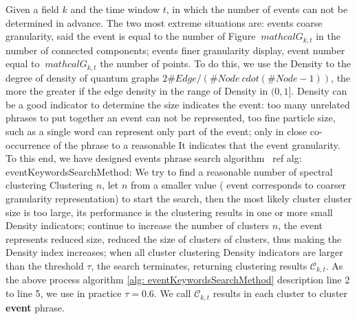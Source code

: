 \documentclass[conference,compsoc]{IEEEtran}
\begin{document}
Given a field \(k \) and the time window \(t \), in which the number of events can not be determined in advance.
The two most extreme situations are: events coarse granularity, said the event is equal to the number of Figure \(\ mathcal {G} _ {k, t} \) in the number of connected components; events finer granularity display, event number equal to \(\ mathcal {G} _ {k, t} \) the number of points.
To do this, we use the Density to the degree of density of quantum graphs \(2 \#Edge / (\# Node \ cdot (\# Node-1)) \), the more the greater if the edge density in the range of Density in \((0,1] \).
Density can be a good indicator to determine the size indicates the event: too many unrelated phrases to put together an event can not be represented, too fine particle size, such as a single word can represent only part of the event; only in close co-occurrence of the phrase to a reasonable It indicates that the event granularity.
To this end, we have designed events phrase search algorithm \ ref {alg: eventKeywordsSearchMethod}: We try to find a reasonable number of spectral clustering Clustering \(n \), let \(n \) from a smaller value ( event corresponds to coarser granularity representation) to start the search, then the most likely cluster cluster size is too large, its performance is the clustering results in one or more small Density indicators; continue to increase the number of clusters \(n \), the event represents reduced size, reduced the size of clusters of clusters, thus making the Density index increases; when all cluster clustering Density indicators are larger than the threshold \(\tau \), the search terminates, returning clustering results \(\mathcal{C}_{k, t}\).
As the above process algorithm \ref{alg: eventKeywordsSearchMethod} description line 2 to line 5, we use in practice \(\tau = 0.6 \).
We call \(\mathcal{C}_{k, t} \) results in each cluster to cluster \textbf{event} phrase.
\end{document}
